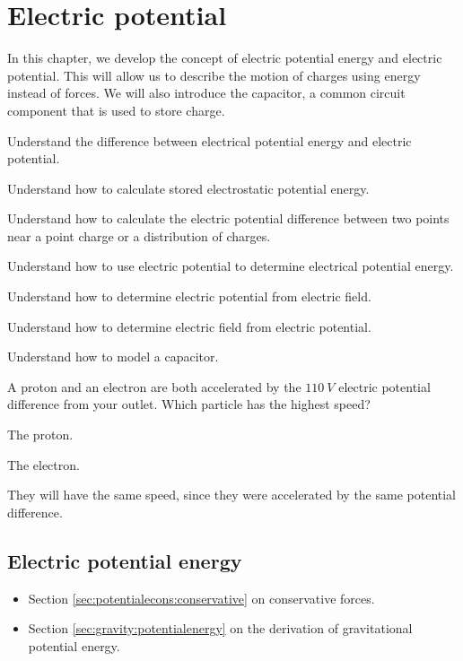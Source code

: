 \chapter{Electric potential}
\label{chapter:potential}
In this chapter, we develop the concept of electric potential energy and electric potential. This will allow us to describe the motion of charges using energy instead of forces. We will also introduce the capacitor, a common circuit component that is used to store charge.

\begin{learningObjectives}{
 \item Understand the difference between electrical potential energy and electric potential.
 \item Understand how to calculate stored electrostatic potential energy.
 \item Understand how to calculate the electric potential difference between two points near a point charge or a distribution of charges. 
 \item Understand how to use electric potential to determine electrical potential energy.
 \item Understand how to determine electric potential from electric field.
 \item Understand how to determine electric field from electric potential.
 \item Understand how to model a capacitor.
 }
\end{learningObjectives}

\begin{opening}
\begin{MCquestion}{A proton and an electron are both accelerated by the $\SI{110}{V}$ electric potential difference from your outlet. Which particle has the highest speed?}
\item The proton.
\item The electron. \correct
\item They will have the same speed, since they were accelerated by the same potential difference.
\end{MCquestion}
\end{opening}

\section{Electric potential energy}
\label{sec:potential:potentialdefinition}

\begin{review}
	\begin{itemize}
		\item Section \ref{sec:potentialecons:conservative} on conservative forces.
		\item Section \ref{sec:gravity:potentialenergy} on the derivation of gravitational potential energy.
	\end{itemize}
\end{review}

